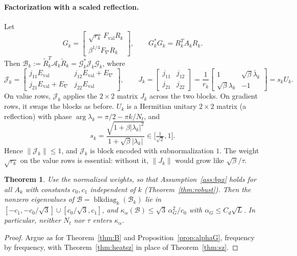 \documentclass[11pt,a4paper]{article}
\newcommand{\A}{\mathcal{A}}
\newcommand{\B}{\mathcal{B}}
\newcommand{\G}{\mathcal{G}}
\newcommand{\J}{\mathcal{J}}
\newcommand{\Rt}{\widetilde R}
\newtheorem{theorem}{Theorem}[section]
\theoremstyle{remark}
\begin{document}
\paragraph{Factorization with a scaled reflection.} Let
\[
G_k=\begin{bmatrix}\sqrt{r_k}\,F_{\mathrm{val}}R_k\\ \beta^{1/4}F_\nabla R_k\end{bmatrix},\qquad
G_k^*G_k=R_k^TA_kR_k .
\]
Then $\B_k:=\Rt_k^T\A_k\Rt_k=\G_k^*\J_k\G_k$, where
\begin{equation}\label{eq:Jk}
\J_k=\begin{bmatrix}j_{11}E_{\mathrm{val}} & j_{12}E_{\mathrm{val}}+E_\nabla\\ j_{21}E_{\mathrm{val}}+E_\nabla & j_{22}E_{\mathrm{val}}\end{bmatrix},\qquad
J_k=\begin{bmatrix}j_{11}&j_{12}\\ j_{21}&j_{22}\end{bmatrix}
=\frac1{r_k}\begin{bmatrix}1&\sqrt\beta\bar\lambda_k\\ \sqrt\beta\lambda_k&-1\end{bmatrix}=s_kU_k .
\end{equation}
On value rows, $\J_k$ applies the $2\times2$ matrix $J_k$ across the two blocks. On
gradient rows, it swaps the blocks as before. $U_k$ is a Hermitian unitary
$2\times2$ matrix (a reflection) with phase $\arg\lambda_k=\pi/2-\pi k/N_t$, and
\[
s_k=\frac{\sqrt{1+\beta|\lambda_k|^2}}{1+\sqrt\beta|\lambda_k|}\in\big[\tfrac1{\sqrt2},1\big].
\]
Hence $\|\J_k\|\le1$, and $\J_k$ is block encoded with subnormalization $1$.
The weight $\sqrt{r_k}$ on the value rows is essential: without it,
$\|J_k\|$ would grow like $\sqrt\beta/\tau$.

\begin{theorem}\label{thm:heatB}
Use the normalized weights, so that Assumption~\ref{ass:bpx} holds for all
$A_k$ with constants $c_0,c_1$ independent of $k$ (Theorem~\ref{thm:robust}). Then the nonzero eigenvalues of $\B=\operatorname{blkdiag}_k(\B_k)$ lie
in $[-c_1,-c_0/\sqrt3]\cup[c_0/\sqrt3,c_1]$, and
$\kappa_\alpha(\B)\le\sqrt3\,\alpha_G^2/c_0$ with $\alpha_G\le C_d\sqrt L$. In particular,
neither $N_t$ nor $\tau$ enters $\kappa_\alpha$.
\end{theorem}
\begin{proof}
Argue as for Theorem~\ref{thm:B} and Proposition~\ref{prop:alphaG},
frequency by frequency, with Theorem~\ref{thm:heatsz} in place of
Theorem~\ref{thm:sz}.
\end{proof}
\end{document}
